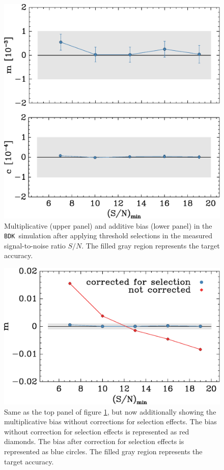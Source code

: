 \documentclass[iop]{emulateapj}
\newcommand{\snr}{$S/N$}
\newcommand{\bdksim}{\texttt{BDK}}
\begin{document}
\begin{figure}[h]
    \centering
    \includegraphics[width=\columnwidth]{mc-select-bias-thresh.eps}

    \caption{Multiplicative (upper panel) and
		additive bias (lower panel) in the \bdksim\ simulation after applying
        threshold selections in the measured signal-to-noise ratio \snr.   
        The filled gray region represents the target accuracy. } 

\label{fig:s2nthresh}
\end{figure}


\begin{figure}[h]
    \centering
    \includegraphics[width=\columnwidth]{mc-select-bias-thresh-with-nocorr.eps}

	\caption{Same as the top panel of figure \ref{fig:s2nthresh}, but now
additionally showing the multiplicative bias without corrections for selection
effects.  The bias without correction for selection effects is represented as
red diamonds. The bias after correction for selection effects is represented as
blue circles.  The filled gray region represents the target accuracy. } 

\label{fig:s2nthresh_nocorr}
\end{figure}
\end{document}
